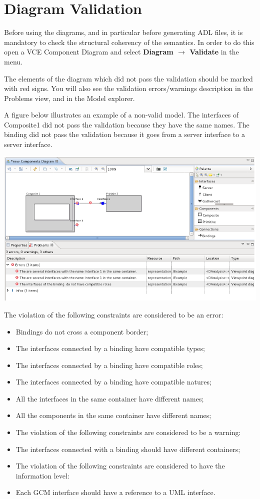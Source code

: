 \documentclass[12pt]{article}
\begin{document}
\section{Diagram Validation}
Before using the diagrams, and in particular before generating ADL files, it is mandatory to check the structural coherency of the semantics. In order to do this open a VCE Component Diagram and select \textbf{Diagram $\rightarrow$ Validate} in the menu. 

The elements of the diagram which did not pass the validation should be marked with red signs. You will also see the validation errors/warnings description in the Problems view, and in the Model explorer.

A figure below illustrates an example of a non-valid model. The interfaces of Composite1 did not pass the validation because they have the same names. The binding did not pass the validation because it goes from a server interface to a server interface.

     \centerline{
     \includegraphics[width=14cm]{draws/valid.png}
     \label{fig:vce-proj}
     }

The violation of the following constraints are considered to be an error:
\begin{itemize}
\item
Bindings do not cross a component border;
\item
The interfaces connected by a binding have compatible types;
\item
The interfaces connected by a binding have compatible roles;
\item
The interfaces connected by a binding have compatible natures;
\item
All the interfaces in the same container have different names;
\item
All the components in the same container have different names;
\item
The violation of the following constraints are considered to be a warning:
\item
The interfaces connected with a binding should have different containers;
\item
The violation of the following constraints are considered to have the information level:
\item
Each GCM interface should have a reference to a UML interface.
\end{itemize}
\end{document}
